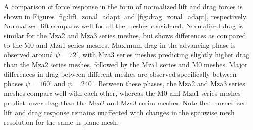 
A comparison of force response in the form of normalized lift and drag forces is shown in Figures \ref{fig:lift_zonal_adapt} and \ref{fig:drag_zonal_adapt}, respectively. Normalized lift compares well for all the meshes considered. Normalized drag is similar for the Mza2 and Mza3 series meshes, but shows differences as compared to the M0 and Mza1 series meshes. Maximum drag in the advancing phase is observed around $\psi=72^\circ$, with Mza3 series meshes predicting slightly higher drag than the Mza2 series meshes, followed by the Mza1 series and M0 meshes. Major differences in drag between different meshes are observed specifically between phases $\psi=160^\circ$ and $\psi=240^\circ$. Between these phases, the Mza2 and Mza3 series meshes compare well with each other, whereas the M0 and Mza1 series meshes predict lower drag than the Mza2 and Mza3 series meshes. Note that normalized lift and drag response remains unaffected with changes in the spanwise mesh resolution for the same in-plane mesh.

